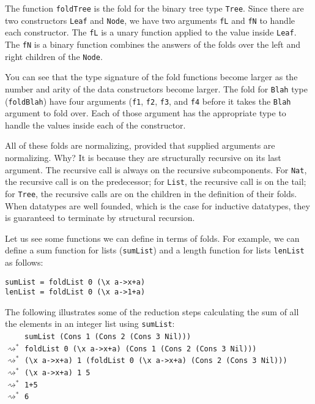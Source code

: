The function \texttt{foldTree} is the fold for the binary tree type
\texttt{Tree}. Since there are two constructors \texttt{Leaf} and \texttt{Node},
we have two arguments \texttt{fL} and \texttt{fN} to handle each constructor.
The \texttt{fL} is a unary function applied to the value inside \texttt{Leaf}.
The \texttt{fN} is a binary function combines the answers of the folds
over the left and right children of the \texttt{Node}.

You can see that the type signature of the fold functions become larger as
the number and arity of the data constructors become larger. The fold for
\texttt{Blah} type (\texttt{foldBlah}) have four arguments (\texttt{f1},
\texttt{f2}, \texttt{f3}, and \texttt{f4} before it takes the \texttt{Blah}
argument to fold over. Each of those argument has the appropriate type
to handle the values inside each of the constructor.

All of these folds are normalizing, provided that supplied arguments are
normalizing. Why? It is because they are structurally recursive on its
last argument. The recursive call is always on the recursive subcomponents.
For \texttt{Nat}, the recursive call is on the predecessor;
for \texttt{List}, the recursive call is on the tail;
for \texttt{Tree}, the recursive calls are on the children
in the definition of their folds. When datatypes are well founded,
which is the case for inductive datatypes, they is guaranteed to terminate
by structural recursion.

Let us see some functions we can define in terms of folds.
For example, we can define a sum function for lists (\texttt{sumList})
and a length function for lists \texttt{lenList} as follows:
\begin{verbatim}
sumList = foldList 0 (\x a->x+a)
lenList = foldList 0 (\x a->1+a)
\end{verbatim}
The following illustrates some of the reduction steps calculating the sum of
all the elements in an integer list using \texttt{sumList}:\\
$\phantom{\rightsquigarrow^{*}}$ \verb|sumList (Cons 1 (Cons 2 (Cons 3 Nil)))|\\
$\rightsquigarrow^{*}$ \verb|foldList 0 (\x a->x+a) (Cons 1 (Cons 2 (Cons 3 Nil)))|\\
$\rightsquigarrow^{*}$ \verb|(\x a->x+a) 1 (foldList 0 (\x a->x+a) (Cons 2 (Cons 3 Nil)))|\\
$\rightsquigarrow^{*}$ \verb|(\x a->x+a) 1 5|\\
$\rightsquigarrow^{*}$ \verb|1+5|\\
$\rightsquigarrow^{*}$ \verb|6|

